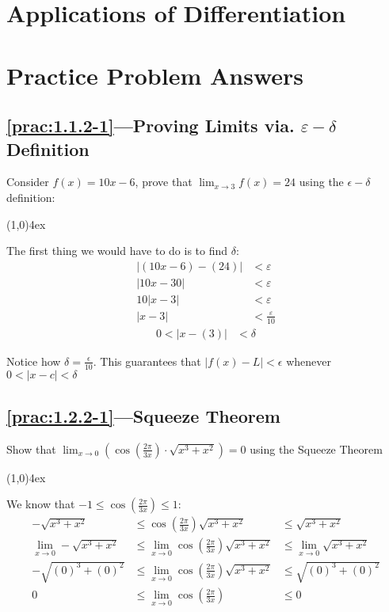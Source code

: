 \documentclass{MathNotes}
\newcommand{\br}{
\begin{center}
\line(1,0){4ex}
\end{center}}
\begin{document}
\section{Applications of Differentiation}



\newpage
\section{Practice Problem Answers}

\subsection*{\ref{prac:1.1.2-1}---Proving Limits via. $\varepsilon-\delta$ Definition}
\label{ans:1.1.2-1}
Consider $f(x)=10x-6$, prove that $\displaystyle\lim_{x\to 3}f(x)=24$ using the 
$\epsilon-\delta$ definition:
\br
The first thing we would have to do is to find $\delta$:
\begin{align*}
    \lvert (10x-6)-(24) \rvert &<\varepsilon  \\
    \lvert 10x-30 \rvert &<\varepsilon \\
    10\lvert x-3 \rvert &<\varepsilon \\
    \lvert x-3 \rvert &<\frac{\varepsilon}{10}
\end{align*}
\begin{align*}
    0 < \lvert x - (3)\rvert &< \delta
\end{align*}

Notice how $\delta=\frac{\epsilon}{10}$. This guarantees that
$\lvert f(x)-L \rvert < \epsilon$ whenever $0<\lvert x-c \rvert<\delta$

\subsection*{\ref{prac:1.2.2-1}---Squeeze Theorem}\label{ans:1.2.2-1}
Show that
$\displaystyle\lim_{x\to 0}(\cos(\frac{2\pi}{3x})\cdot\sqrt{x^3+x^2})=0$
using the Squeeze Theorem
\br
We know that $\displaystyle-1\leq\cos(\frac{2\pi}{3x})\leq 1$:
\begin{align*}
    -\sqrt{x^3+x^2}&\leq\cos(\frac{2\pi}{3x})\sqrt{x^3+x^2}&\leq
    \sqrt{x^3+x^2}
    \\
    \lim_{x\to 0}-\sqrt{x^3+x^2}&\leq\lim_{x\to 0}\cos(\frac{2\pi}{3x})
    \sqrt{x^3+x^2}&\leq\lim_{x\to 0}\sqrt{x^3+x^2}
    \\
    -\sqrt{(0)^3+(0)^2}&\leq\lim_{x\to 0}\cos(\frac{2\pi}{3x})
    \sqrt{x^3+x^2}&\leq\sqrt{(0)^3+(0)^2}
    \\
    0&\leq\lim_{x\to 0}\cos(\frac{2\pi}{3x})&\leq0 
\end{align*}
\end{document}
